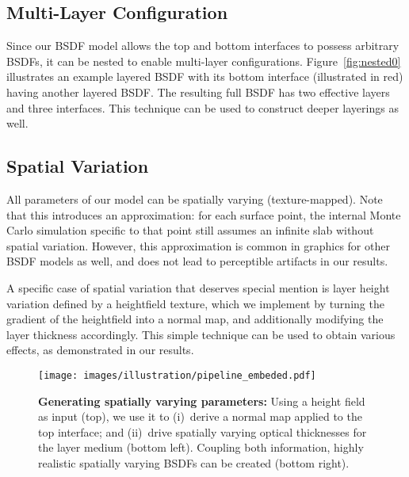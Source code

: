 \subsection{Multi-Layer Configuration}
\label{subsec:multi_layer}
%
Since our BSDF model allows the top and bottom interfaces to possess arbitrary BSDFs, it can be nested to enable multi-layer configurations.
Figure~\ref{fig:nested0} illustrates an example layered BSDF with its bottom interface (illustrated in red) having another layered BSDF.
The resulting full BSDF has two effective layers and three interfaces. This technique can be used to construct deeper layerings as well.


\subsection{Spatial Variation}

All parameters of our model can be spatially varying (texture-mapped). Note that this introduces an approximation: for each surface point, the internal Monte Carlo simulation specific to that point still assumes an infinite slab without spatial variation. However, this approximation is common in graphics for other BSDF models as well, and does not lead to perceptible artifacts in our results. 

A specific case of spatial variation that deserves special mention is layer height variation defined by a heightfield texture, which we implement by turning the gradient of the heightfield into a normal map, and additionally modifying the layer thickness accordingly. This simple technique can be used to obtain various effects, as demonstrated in our results.

\begin{figure}[b]
	\centering
	\texttt{[image: images/illustration/pipeline\_embeded.pdf]}
	\caption{\label{fig:model_creation}
		\textbf{Generating spatially varying parameters:}
		Using a height field as input (top), we use it to (i)~derive a normal map applied to the top interface; and (ii)~drive spatially varying optical thicknesses for the layer medium (bottom left).
		Coupling both information, highly realistic spatially varying BSDFs can be created (bottom right).
	}
\end{figure}

